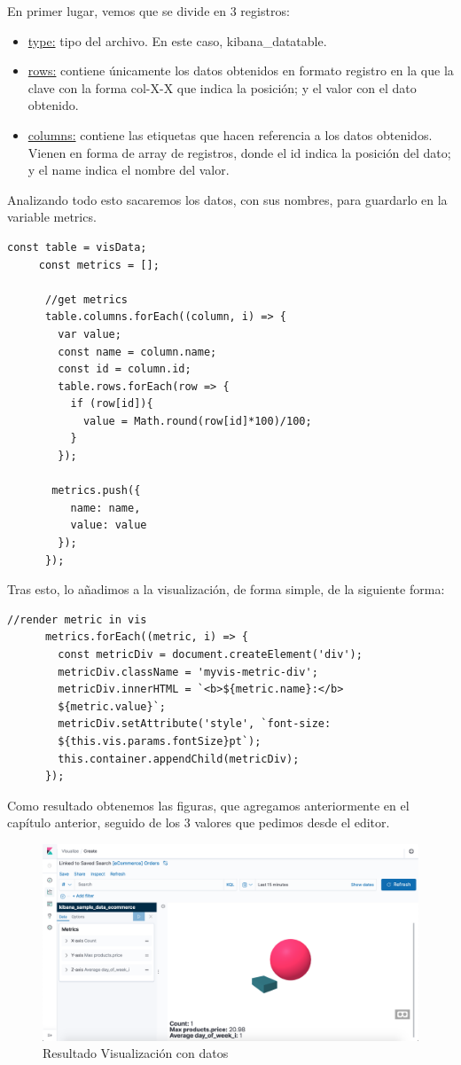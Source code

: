 \documentclass[a4paper, 12pt]{book}
\begin{document}
En primer lugar, vemos que se divide en 3 registros: 
\begin{itemize}
    \item \underline{type:} tipo del archivo. En este caso, kibana\_datatable.
    \item \underline{rows:} contiene únicamente los datos obtenidos en formato registro en la que la clave con la forma col-X-X que indica la posición; y el valor con el dato obtenido.
    \item \underline{columns:} contiene las etiquetas que hacen referencia a los datos obtenidos. Vienen en forma de array de registros, donde el id indica la posición del dato; y el name indica el nombre del valor. 
\end{itemize}
Analizando todo esto sacaremos los datos, con sus nombres, para guardarlo en la variable metrics.

\begin{lstlisting}[frame=single]
     const table = visData;
     const metrics = [];

      //get metrics
      table.columns.forEach((column, i) => {
        var value;
        const name = column.name;
        const id = column.id;
        table.rows.forEach(row => {
          if (row[id]){
            value = Math.round(row[id]*100)/100;
          }
        });

       metrics.push({
          name: name,
          value: value
        });
      });
\end{lstlisting}
Tras esto, lo añadimos a la visualización, de forma simple, de la siguiente forma:
\begin{lstlisting}[frame=single]
      //render metric in vis
      metrics.forEach((metric, i) => {
        const metricDiv = document.createElement('div');
        metricDiv.className = 'myvis-metric-div';
        metricDiv.innerHTML = `<b>${metric.name}:</b> 
        ${metric.value}`;
        metricDiv.setAttribute('style', `font-size: 
        ${this.vis.params.fontSize}pt`);
        this.container.appendChild(metricDiv);
      });
\end{lstlisting}
Como resultado obtenemos las figuras, que agregamos anteriormente en el capítulo anterior, seguido de los 3 valores que pedimos desde el editor.
\begin{figure}[H]
  \centering
  \includegraphics[width=16cm, keepaspectratio]{img/development/resultado-simple-data.png}
  \caption{Resultado Visualización con datos}
  \label{fig:simplewithdata}
\end{figure}
\end{document}
